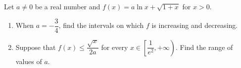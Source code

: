 Let $a\ne0$ be a real number and $f(x)=a\ln x+\sqrt{1+x}$ for $x>0$.
\begin{enumerate}
\item[(I)] When $a=-\dfrac34$, find the intervals on which $f$ is increasing and decreasing.
\item[(II)] Suppose that $f(x)\le\dfrac{\sqrt x}{2a}$ for every $x\in\left[\dfrac{1}{e^2},+\infty\right)$. Find the range of values of $a$.
\end{enumerate}
